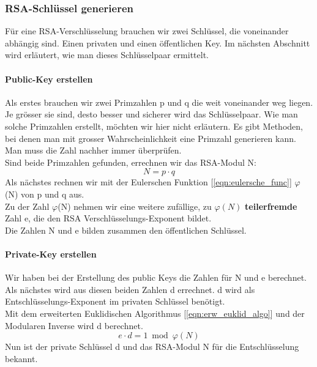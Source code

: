 \subsubsection{RSA-Schlüssel generieren}
Für eine RSA-Verschlüsselung brauchen wir zwei Schlüssel, die voneinander abhängig sind. Einen privaten und einen öffentlichen Key. Im nächsten Abschnitt wird erläutert, wie man dieses Schlüsselpaar ermittelt.%
%
\paragraph{Public-Key erstellen}\label{sec:public_key}
Als erstes brauchen wir zwei Primzahlen p und q die weit voneinander weg liegen. Je grösser sie sind, desto besser und sicherer wird das Schlüsselpaar. Wie man solche Primzahlen erstellt, möchten wir hier nicht erläutern. Es gibt Methoden, bei denen man mit grosser Wahrscheinlichkeit eine Primzahl generieren kann. Man muss die Zahl nachher immer überprüfen.\\
Sind beide Primzahlen gefunden, errechnen wir das RSA-Modul N: %
%
\begin{equation}
  N = p \cdot q
  \label{eqn:rsa_modul}
\end{equation}
%
Als nächstes rechnen wir mit der Eulerschen Funktion [\ref{eqn:eulersche_func}] $\varphi$(N) von p und q aus.\\
Zu der Zahl $\varphi$(N) nehmen wir eine weitere zufällige, zu $\varphi(N)$ \textbf{teilerfremde} Zahl e, die den RSA Verschlüsselungs-Exponent bildet.\\
Die Zahlen N und e bilden zusammen den öffentlichen Schlüssel.
\paragraph{Private-Key erstellen}
Wir haben bei der Erstellung des public Keys die Zahlen für N und e berechnet. Als nächstes wird aus diesen beiden Zahlen d errechnet. d wird als Entschlüsselungs-Exponent im privaten Schlüssel benötigt.\\
Mit dem erweiterten Euklidischen Algorithmus [\ref{eqn:erw_euklid_algo}] und der Modularen Inverse wird d berechnet.\\
\begin{equation}
	e \cdot d = 1 \bmod{ \varphi(N) } 
	\label{eqn:rsa_private_key_erstellen}
\end{equation}
%
%
%
Nun ist der private Schlüssel d und das RSA-Modul N für die Entschlüsselung bekannt.
